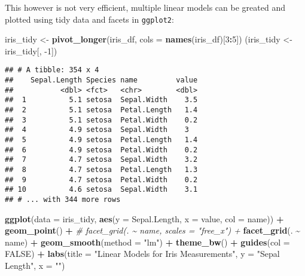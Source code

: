\documentclass[
]{article}
\newenvironment{Shaded}{\begin{snugshade}}{\end{snugshade}}
\newcommand{\CommentTok}[1]{\textcolor[rgb]{0.56,0.35,0.01}{\textit{#1}}}
\newcommand{\DataTypeTok}[1]{\textcolor[rgb]{0.13,0.29,0.53}{#1}}
\newcommand{\DecValTok}[1]{\textcolor[rgb]{0.00,0.00,0.81}{#1}}
\newcommand{\KeywordTok}[1]{\textcolor[rgb]{0.13,0.29,0.53}{\textbf{#1}}}
\newcommand{\NormalTok}[1]{#1}
\newcommand{\OperatorTok}[1]{\textcolor[rgb]{0.81,0.36,0.00}{\textbf{#1}}}
\newcommand{\OtherTok}[1]{\textcolor[rgb]{0.56,0.35,0.01}{#1}}
\newcommand{\StringTok}[1]{\textcolor[rgb]{0.31,0.60,0.02}{#1}}
\begin{document}
This however is not very efficient, multiple linear models can be
greated and plotted using tidy data and facets in \texttt{ggplot2}:

\begin{Shaded}
\begin{Highlighting}[]
\NormalTok{iris\_tidy <{-}}\StringTok{ }\KeywordTok{pivot\_longer}\NormalTok{(iris\_df, }\DataTypeTok{cols =} \KeywordTok{names}\NormalTok{(iris\_df)[}\DecValTok{3}\OperatorTok{:}\DecValTok{5}\NormalTok{])}
\NormalTok{(iris\_tidy <{-}}\StringTok{ }\NormalTok{iris\_tidy[, }\DecValTok{{-}1}\NormalTok{])}
\end{Highlighting}
\end{Shaded}

\begin{verbatim}
## # A tibble: 354 x 4
##    Sepal.Length Species name         value
##           <dbl> <fct>   <chr>        <dbl>
##  1          5.1 setosa  Sepal.Width    3.5
##  2          5.1 setosa  Petal.Length   1.4
##  3          5.1 setosa  Petal.Width    0.2
##  4          4.9 setosa  Sepal.Width    3  
##  5          4.9 setosa  Petal.Length   1.4
##  6          4.9 setosa  Petal.Width    0.2
##  7          4.7 setosa  Sepal.Width    3.2
##  8          4.7 setosa  Petal.Length   1.3
##  9          4.7 setosa  Petal.Width    0.2
## 10          4.6 setosa  Sepal.Width    3.1
## # ... with 344 more rows
\end{verbatim}

\begin{Shaded}
\begin{Highlighting}[]
\KeywordTok{ggplot}\NormalTok{(}\DataTypeTok{data =}\NormalTok{ iris\_tidy, }\KeywordTok{aes}\NormalTok{(}\DataTypeTok{y =}\NormalTok{ Sepal.Length, }\DataTypeTok{x =}\NormalTok{ value, }\DataTypeTok{col =}\NormalTok{ name)) }\OperatorTok{+}
\StringTok{  }\KeywordTok{geom\_point}\NormalTok{() }\OperatorTok{+}\StringTok{ }
\CommentTok{\#  facet\_grid(. \textasciitilde{} name, scales = "free\_x") +}
\StringTok{  }\KeywordTok{facet\_grid}\NormalTok{(. }\OperatorTok{\textasciitilde{}}\StringTok{ }\NormalTok{name) }\OperatorTok{+}
\StringTok{  }\KeywordTok{geom\_smooth}\NormalTok{(}\DataTypeTok{method =} \StringTok{"lm"}\NormalTok{) }\OperatorTok{+}
\StringTok{  }\KeywordTok{theme\_bw}\NormalTok{() }\OperatorTok{+}
\StringTok{  }\KeywordTok{guides}\NormalTok{(}\DataTypeTok{col =} \OtherTok{FALSE}\NormalTok{) }\OperatorTok{+}
\StringTok{  }\KeywordTok{labs}\NormalTok{(}\DataTypeTok{title =} \StringTok{"Linear Models for Iris Measurements"}\NormalTok{, }\DataTypeTok{y =} \StringTok{"Sepal Length"}\NormalTok{, }\DataTypeTok{x =} \StringTok{""}\NormalTok{)}
\end{Highlighting}
\end{Shaded}
\end{document}
